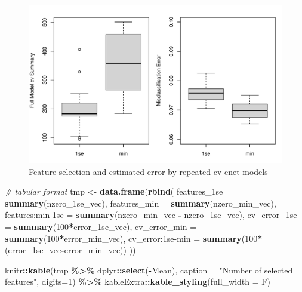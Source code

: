 \documentclass[
]{book}
\newenvironment{Shaded}{\begin{snugshade}}{\end{snugshade}}
\newcommand{\CommentTok}[1]{\textcolor[rgb]{0.56,0.35,0.01}{\textit{#1}}}
\newcommand{\DataTypeTok}[1]{\textcolor[rgb]{0.13,0.29,0.53}{#1}}
\newcommand{\DecValTok}[1]{\textcolor[rgb]{0.00,0.00,0.81}{#1}}
\newcommand{\KeywordTok}[1]{\textcolor[rgb]{0.13,0.29,0.53}{\textbf{#1}}}
\newcommand{\NormalTok}[1]{#1}
\newcommand{\OperatorTok}[1]{\textcolor[rgb]{0.81,0.36,0.00}{\textbf{#1}}}
\newcommand{\StringTok}[1]{\textcolor[rgb]{0.31,0.60,0.02}{#1}}
\begin{document}
\begin{figure}
\centering
\includegraphics{Static/figures/hcc5hmC-glmnetSuiteB-model-size-enetAll-1.pdf}
\caption{\label{fig:hcc5hmC-glmnetSuiteB-model-size-enetAll}Feature selection and estimated error by repeated cv enet models}
\end{figure}

\begin{Shaded}
\begin{Highlighting}[]
\CommentTok{\# tabular format}
\NormalTok{tmp <{-}}\StringTok{ }\KeywordTok{data.frame}\NormalTok{(}\KeywordTok{rbind}\NormalTok{(}
 \StringTok{\textasciigrave{}}\DataTypeTok{features\_1se}\StringTok{\textasciigrave{}}\NormalTok{ =}\StringTok{ }\KeywordTok{summary}\NormalTok{(nzero\_1se\_vec),}
 \DataTypeTok{features\_min =} \KeywordTok{summary}\NormalTok{(nzero\_min\_vec),}
 \StringTok{\textasciigrave{}}\DataTypeTok{features:min{-}1se}\StringTok{\textasciigrave{}}\NormalTok{ =}\StringTok{ }\KeywordTok{summary}\NormalTok{(nzero\_min\_vec }\OperatorTok{{-}}\StringTok{ }\NormalTok{nzero\_1se\_vec),}
 \StringTok{\textasciigrave{}}\DataTypeTok{cv\_error\_1se}\StringTok{\textasciigrave{}}\NormalTok{ =}\StringTok{ }\KeywordTok{summary}\NormalTok{(}\DecValTok{100}\OperatorTok{*}\NormalTok{error\_1se\_vec),}
 \DataTypeTok{cv\_error\_min =} \KeywordTok{summary}\NormalTok{(}\DecValTok{100}\OperatorTok{*}\NormalTok{error\_min\_vec),}
 \StringTok{\textasciigrave{}}\DataTypeTok{cv\_error:1se{-}min}\StringTok{\textasciigrave{}}\NormalTok{ =}\StringTok{ }\KeywordTok{summary}\NormalTok{(}\DecValTok{100}\OperatorTok{*}\NormalTok{(error\_1se\_vec}\OperatorTok{{-}}\NormalTok{error\_min\_vec))}
\NormalTok{))}

\NormalTok{knitr}\OperatorTok{::}\KeywordTok{kable}\NormalTok{(tmp }\OperatorTok{\%>\%}\StringTok{ }\NormalTok{dplyr}\OperatorTok{::}\KeywordTok{select}\NormalTok{(}\OperatorTok{{-}}\NormalTok{Mean),}
  \DataTypeTok{caption =} \StringTok{"Number of selected features"}\NormalTok{,}
  \DataTypeTok{digits=}\DecValTok{1}\NormalTok{) }\OperatorTok{\%>\%}
\StringTok{   }\NormalTok{kableExtra}\OperatorTok{::}\KeywordTok{kable\_styling}\NormalTok{(}\DataTypeTok{full\_width =}\NormalTok{ F)}
\end{Highlighting}
\end{Shaded}
\end{document}
